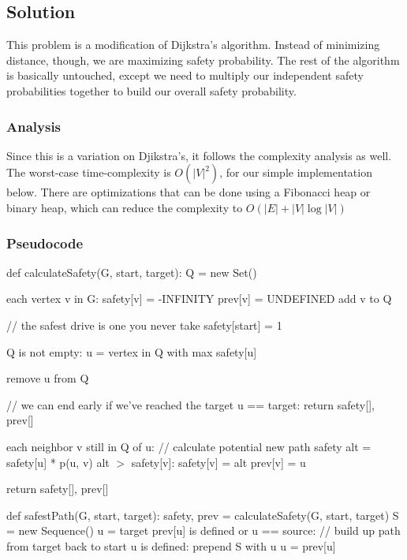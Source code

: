 \subsection*{Solution}

This problem is a modification of Dijkstra's algorithm. Instead of minimizing distance, though, we are maximizing safety probability. The rest of the algorithm is basically untouched, except we need to multiply our independent safety probabilities together to build our overall safety probability.

\subsubsection*{Analysis}

Since this is a variation on Djikstra's, it follows the complexity analysis as well. The worst-case time-complexity is $O(|V|^2)$, for our simple implementation below. There are optimizations that can be done using a Fibonacci heap or binary heap, which can reduce the complexity to $O(|E| + |V| \log |V|)$

\subsubsection*{Pseudocode}
\begin{codebox}
\li def calculateSafety(G, start, target):
\Then
  \li  Q = new Set()

  \li
  \li \For each vertex v in G:
  \Then
    \li  safety[v] = -INFINITY
    \li  prev[v] = UNDEFINED
    \li  add v to Q
  \End

  \li
  \li // the safest drive is one you never take
  \li safety[start] = 1

  \li
  \li \While Q is not empty:
  \Then
    \li u = vertex in Q with max safety[u]

    \li remove u from Q

    \li // we can end early if we've reached the target
    \li \If u == target:
    \Then
      \li return safety[], prev[]
    \End

    \li \For each neighbor v still in Q of u:
    \Then
      \li // calculate potential new path safety
      \li alt = safety[u] * p(u, v)
      \li \If alt $>$ safety[v]:
      \Then
        \li safety[v] = alt
        \li prev[v] = u
      \End
    \End
  \End

  \li return safety[], prev[]
\End
\li

\li def safestPath(G, start, target):
\Then
  \li safety, prev = calculateSafety(G, start, target)
  \li
  \li S = new Sequence()
  \li u = target
  \li \If prev[u] is defined or u == source:
  \Then
    \li // build up path from target back to start
    \li \While u is defined:
    \Then
      \li prepend S with u
      \li u = prev[u]
    \End
  \End

\end{codebox}

\pagebreak
